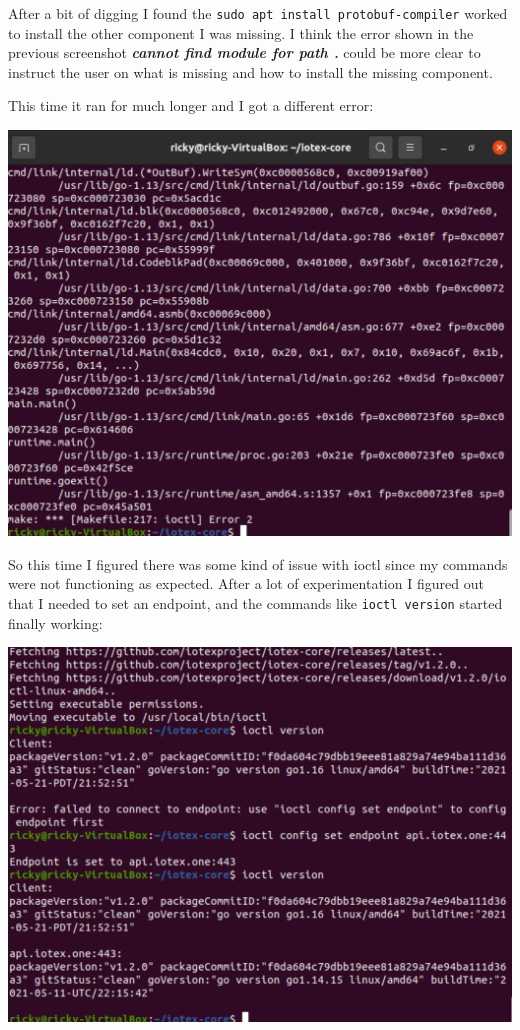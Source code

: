 \documentclass[
]{book}
\begin{document}
After a bit of digging I found the
\texttt{sudo\ apt\ install\ protobuf-compiler} worked to install the
other component I was missing. I think the error shown in the previous
screenshot \textbf{\emph{cannot find module for path .}} could be more
clear to instruct the user on what is missing and how to install the
missing component.

This time it ran for much longer and I got a different error:

\includegraphics{images/protoc_error.PNG}

So this time I figured there was some kind of issue with ioctl since my
commands were not functioning as expected. After a lot of
experimentation I figured out that I needed to set an endpoint, and the
commands like \texttt{ioctl\ version} started finally working:

\includegraphics{images/linux_set_endpoint.PNG}
\end{document}
